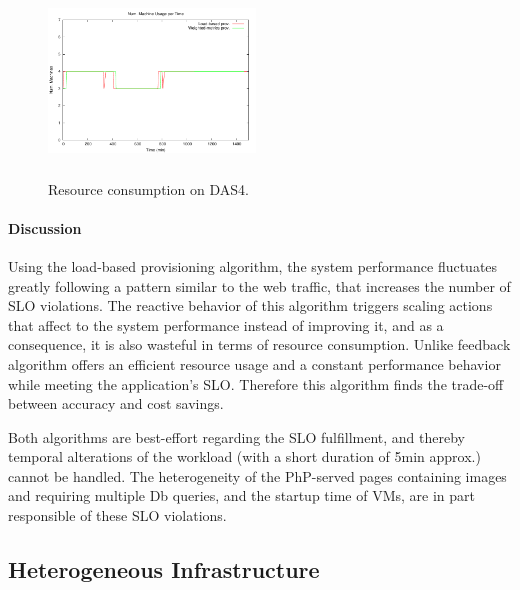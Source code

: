 \begin{figure}
\begin{center}
\includegraphics[width=0.49\textwidth, height=5cm]{./images/homogeneous/numMachinesComp}
\end{center}
\caption{Resource consumption on DAS4.}
\label{resComDas4}
\end{figure}

\paragraph{Discussion}

Using the load-based provisioning algorithm, the system performance fluctuates greatly following a pattern similar to the web traffic, that increases the number of SLO violations. The reactive behavior of this algorithm triggers scaling actions that affect to the system performance instead of improving it, and as a consequence, it is also wasteful in terms of resource consumption. Unlike feedback algorithm offers an efficient resource usage and a constant performance behavior while meeting the application's SLO. Therefore this algorithm finds the trade-off between accuracy and cost savings.

Both algorithms are best-effort regarding the SLO fulfillment, and thereby temporal alterations of the workload (with a short duration of 5min approx.) cannot be handled. The heterogeneity of the PhP-served pages containing images and requiring multiple Db queries, and the startup time of VMs, are in part responsible of these SLO violations. 




\subsection*{Heterogeneous Infrastructure}


